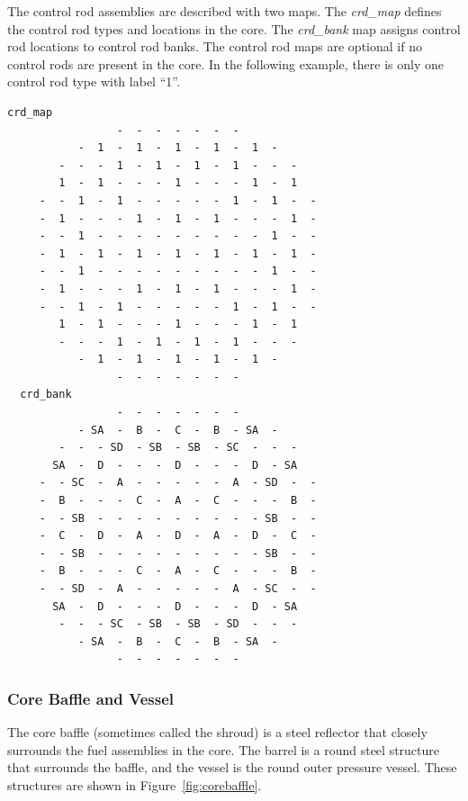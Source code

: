 The control rod assemblies are described with two maps.  The {\it crd\_map}
defines the control rod types and locations in the core.
The {\it crd\_bank} map assigns control rod locations to control rod banks.
The control rod maps are optional if no control rods are present in the core.
In the following example, there is only one control rod type with label ``1''.
\vfill   %
\begin{Verbatim}[fontsize=\small]
  crd_map
                 -  -  -  -  -  -  -
           -  1  -  1  -  1  -  1  -  1  -
        -  -  -  1  -  1  -  1  -  1  -  -  -
        1  -  1  -  -  -  1  -  -  -  1  -  1
     -  -  1  -  1  -  -  -  -  -  1  -  1  -  -
     -  1  -  -  -  1  -  1  -  1  -  -  -  1  -
     -  -  1  -  -  -  -  -  -  -  -  -  1  -  -
     -  1  -  1  -  1  -  1  -  1  -  1  -  1  -
     -  -  1  -  -  -  -  -  -  -  -  -  1  -  -
     -  1  -  -  -  1  -  1  -  1  -  -  -  1  -
     -  -  1  -  1  -  -  -  -  -  1  -  1  -  -
        1  -  1  -  -  -  1  -  -  -  1  -  1
        -  -  -  1  -  1  -  1  -  1  -  -  -
           -  1  -  1  -  1  -  1  -  1  -
                 -  -  -  -  -  -  -
  crd_bank
                 -  -  -  -  -  -  -
           - SA  -  B  -  C  -  B  - SA  -
        -  -  - SD  - SB  - SB  - SC  -  -  -
       SA  -  D  -  -  -  D  -  -  -  D  - SA
     -  - SC  -  A  -  -  -  -  -  A  - SD  -  -
     -  B  -  -  -  C  -  A  -  C  -  -  -  B  -
     -  - SB  -  -  -  -  -  -  -  -  - SB  -  -
     -  C  -  D  -  A  -  D  -  A  -  D  -  C  -
     -  - SB  -  -  -  -  -  -  -  -  - SB  -  -
     -  B  -  -  -  C  -  A  -  C  -  -  -  B  -
     -  - SD  -  A  -  -  -  -  -  A  - SC  -  -
       SA  -  D  -  -  -  D  -  -  -  D  - SA
        -  -  - SC  - SB  - SB  - SD  -  -  -
           - SA  -  B  -  C  -  B  - SA  -
                 -  -  -  -  -  -  -

\end{Verbatim}

\subsubsection{Core Baffle and Vessel}

The core baffle (sometimes called the shroud) is a steel reflector that closely surrounds
the fuel assemblies in the core. The barrel is a round steel structure that surrounds the baffle, and
the vessel is the round outer pressure vessel.  These structures are shown in
Figure~\ref{fig:corebaffle}.

